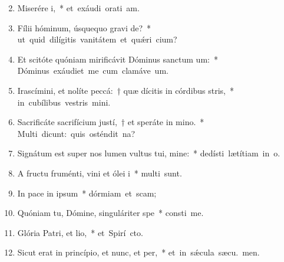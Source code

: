 \begin{flushleft}
\begin{enumerate}[leftmargin=*]
\setcounter{enumi}{1}

\item Miserére i,~* \mbox{et exáudi orati am.}
\item Fílii hóminum, úsquequo gravi de?~* \mbox{ut quid dilígitis vanitátem et qu\'{\ae}ri cium?}
\item Et scitóte quóniam mirificávit Dóminus sanctum um:~* \mbox{Dóminus exáudiet me cum clamáve  um.}
\item Irascímini, et nolíte peccá:~† quæ dícitis in córdibus stris,~* \mbox{in cubílibus vestris mini.}
\item Sacrificáte sacrifícium justí,~† et speráte in mino.~* \mbox{Multi dicunt: quis osténdit  na?}
\item Signátum est super nos lumen vultus tui, mine:~* \mbox{dedísti lætítiam in  o.}
\item A fructu fruménti, vini et ólei i~* \mbox{multi sunt.}
\item In pace in ipsum~* \mbox{dórmiam et scam;}
\item Quóniam tu, Dómine, singuláriter  spe~* \mbox{consti me.}
\item Glória Patri, et lio,~* \mbox{et Spirí cto.}
\item Sicut erat in princípio, et nunc, et per,~* \mbox{et in s\'{\ae}cula sæcu. men.}

\end{enumerate}
\end{flushleft}


